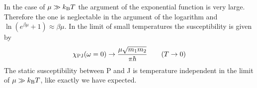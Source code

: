 In the case of $\mu \gg k_{\mathrm{B}} T$ the argument of the exponential function is very large.
Therefore the one is neglectable in the argument of the logarithm and $\ln(e^{\beta\mu} + 1) \approx \beta\mu$.
In the limit of small temperatures the susceptibility is given by
%
\begin{align}
	\chi_{\mathrm{PJ}}(\omega = 0) \to \frac{\mu \sqrt{m_{1} m_{2}}}{\pi \hbar} \qquad (T \to 0)
\end{align}
%
The static susceptibility between P and J is temperature independent in the limit of $\mu \gg k_{\mathrm{B}} T$, like exactly we have expected.











































